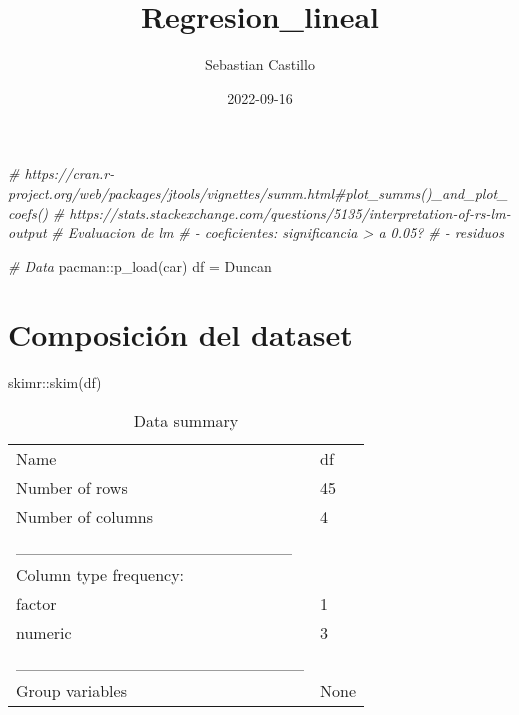 \documentclass[
]{article}
\title{Regresion\_lineal}
\author{Sebastian Castillo}
\date{2022-09-16}
\newenvironment{Shaded}{\begin{snugshade}}{\end{snugshade}}
\newcommand{\CommentTok}[1]{\textcolor[rgb]{0.56,0.35,0.01}{\textit{#1}}}
\newcommand{\FunctionTok}[1]{\textcolor[rgb]{0.00,0.00,0.00}{#1}}
\newcommand{\NormalTok}[1]{#1}
\newcommand{\OtherTok}[1]{\textcolor[rgb]{0.56,0.35,0.01}{#1}}
\newcommand{\SpecialCharTok}[1]{\textcolor[rgb]{0.00,0.00,0.00}{#1}}
\begin{document}
\maketitle

\begin{Shaded}
\begin{Highlighting}[]
\CommentTok{\# https://cran.r{-}project.org/web/packages/jtools/vignettes/summ.html\#plot\_summs()\_and\_plot\_coefs()}
\CommentTok{\# https://stats.stackexchange.com/questions/5135/interpretation{-}of{-}rs{-}lm{-}output}
\CommentTok{\# Evaluacion de lm}
\CommentTok{\# {-} coeficientes: significancia \textgreater{} a 0.05?}
\CommentTok{\# {-} residuos}
\end{Highlighting}
\end{Shaded}

\begin{Shaded}
\begin{Highlighting}[]
\CommentTok{\# Data}
\NormalTok{pacman}\SpecialCharTok{::}\FunctionTok{p\_load}\NormalTok{(car)}
\NormalTok{df }\OtherTok{=}\NormalTok{  Duncan}
\end{Highlighting}
\end{Shaded}

\hypertarget{composiciuxf3n-del-dataset}{%
\section{Composición del dataset}\label{composiciuxf3n-del-dataset}}

\begin{Shaded}
\begin{Highlighting}[]
\NormalTok{skimr}\SpecialCharTok{::}\FunctionTok{skim}\NormalTok{(df)}
\end{Highlighting}
\end{Shaded}

\begin{longtable}[]{@{}ll@{}}
\caption{Data summary}\tabularnewline
\toprule()
\endhead
Name & df \\
Number of rows & 45 \\
Number of columns & 4 \\
\_\_\_\_\_\_\_\_\_\_\_\_\_\_\_\_\_\_\_\_\_\_\_ & \\
Column type frequency: & \\
factor & 1 \\
numeric & 3 \\
\_\_\_\_\_\_\_\_\_\_\_\_\_\_\_\_\_\_\_\_\_\_\_\_ & \\
Group variables & None \\
\bottomrule()
\end{longtable}
\end{document}

